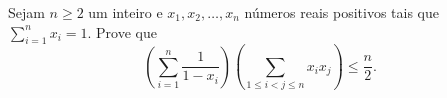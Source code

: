 Sejam $n \ge 2$ um inteiro e $x_1, x_2, \dots, x_n$ números reais positivos tais que $\sum_{i=1}^{n} x_i = 1$.
Prove que $$ \left( \sum_{i=1}^{n} \frac{1}{1-x_i}  \right) \left( \sum_{1 \le i < j \le n} x_i x_j \right) \le \frac{n}{2}.$$